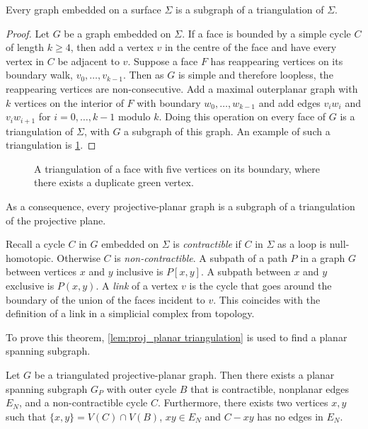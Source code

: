 \begin{theorem}\label{thm:triangulation_subgraph}
    Every graph embedded on a surface $\Sigma$ is a subgraph of a triangulation of $\Sigma$.
\end{theorem}

\begin{proof}
    Let $G$ be a graph embedded on $\Sigma$. If a face is bounded by a simple cycle $C$ of length $k \geq 4$, then add a vertex $v$ in the centre of the face and have every vertex in $C$ be adjacent to $v$. Suppose a face $F$ has reappearing vertices on its boundary walk, $v_0, \ldots, v_{k-1}$. Then as $G$ is simple and therefore loopless, the reappearing vertices are non-consecutive. Add a maximal outerplanar graph with $k$ vertices on the interior of $F$ with boundary $w_0, \ldots, w_{k-1}$ and add edges $v_i w_i$ and $v_i w_{i + 1}$ for $i = 0, \ldots, {k-1}$ modulo $k$. Doing this operation on every face of $G$ is a triangulation of $\Sigma$, with $G$ a subgraph of this graph. An example of such a triangulation is \cref{fig:triangulation}.
\end{proof}
\begin{figure}[h!]
    \centering
    
    \caption[Face triangulation]{A triangulation of a face with five vertices on its boundary, where there exists a duplicate green vertex.}\label{fig:triangulation}
\end{figure}
As a consequence, every projective-planar graph is a subgraph of a triangulation of the projective plane. 

Recall a cycle $C$ in $G$ embedded on $\Sigma$ is \textit{contractible} if $C$ in $\Sigma$ as a loop is null-homotopic. Otherwise $C$ is \textit{ non-contractible}. A subpath of a path $P$ in a graph $G$ between vertices $x$ and $y$ inclusive is $P[x, y]$. A subpath between $x$ and $y$ exclusive is $P(x, y)$. 
A \textit{link} of a vertex $v$ is the cycle that goes around the boundary of the union of the faces incident to $v$. This coincides with the definition of a link in a simplicial complex from topology. 

To prove this theorem, \cref{lem:proj_planar triangulation} is used to find a planar spanning subgraph.

\begin{lemma}\label{lem:proj_planar triangulation}
    Let $G$ be a triangulated projective-planar graph. Then there exists a planar spanning subgraph $G_P$ with outer cycle $B$ that is contractible, nonplanar edges $E_N$, and a non-contractible cycle $C$. Furthermore, there exists two vertices $x, y$ such that $\{x, y \} = V(C) \cap V(B)$, $xy \in E_N$ and $C - xy$ has no edges in $E_N$. 
\end{lemma}

